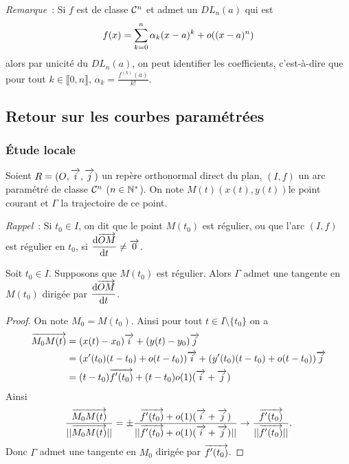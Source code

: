 \emph{Remarque}~: Si \(f\) est de classe \(\mathcal{C}^{n}\) et admet un \(DL_n(a)\)
qui est
\begin{equation}
  f(x) = \sum_{k = 0}^n \alpha_k(x-a)^k +o\mathopen{}\left((x-a)^n\right)
\end{equation}
alors par unicité du \(DL_n(a)\), on peut identifier les coefficients,
c'est-à-dire que pour tout \(k \in \llbracket 0,n \rrbracket\), \(\alpha_k =
\frac{f^{(k)}(a)}{k!}\).

\subsection{Retour sur les courbes paramétrées}

\subsubsection{Étude locale}

Soient \(R = (O,\overrightarrow{i},\overrightarrow{j})\) un repère orthonormal direct du plan, \((I,f)\) un arc
paramétré de classe \(\mathcal{C}^{n}\) (\(n \in \mathbb{N}^*\)). On note
\(M(t)(x(t),y(t))\)le point courant et \(\Gamma\) la trajectoire de ce point.

\emph{Rappel}~: Si \(t_0 \in I\), on dit que le point \(M(t_0)\) est régulier,
ou que l'arc \((I,f)\) est régulier en \(t_0\), si \(\dfrac{\mathrm{d} \overrightarrow{OM}}{\mathrm{d} t} \neq
\overrightarrow{0}\).

\begin{prop}
  Soit \(t_0 \in I\). Supposons que \(M(t_0)\) est régulier. Alors \(\Gamma\)
  admet une tangente en \(M(t_0)\) dirigée par \(\dfrac{\mathrm{d} \overrightarrow{OM}}{\mathrm{d} t}\).
\end{prop}
\begin{proof}
  On note \(M_0 = M(t_0)\). Ainsi pour tout \(t \in I\setminus\{t_0\}\) on a
  \begin{align*}
    \overrightarrow{M_0M(t)} &= (x(t)-x_0)\overrightarrow{i} + (y(t)-y_0)\overrightarrow{j} \\
    &= (x'(t_0)(t-t_0) +o(t-t_0))\overrightarrow{i} + (y'(t_0)(t-t_0) +o(t-t_0))\overrightarrow{j}\\
    & = (t-t_0)\overrightarrow{f'(t_0)} +(t-t_0)o(1)(\overrightarrow{i}+\overrightarrow{j})
  \end{align*}
  Ainsi
  \begin{equation}
    \frac{\overrightarrow{M_0M(t)}}{||\overrightarrow{M_0M(t)}||} = \pm \frac{\overrightarrow{f'(t_0)}
    +o(1)(\overrightarrow{i}+\overrightarrow{j})}{||\overrightarrow{f'(t_0)} +o(1)(\overrightarrow{i}+\overrightarrow{j})||} \to
    \frac{\overrightarrow{f'(t_0)}}{||\overrightarrow{f'(t_0)}||}.
  \end{equation}
  Donc \(\Gamma\) admet une tangente en \(M_0\) dirigée par \(\overrightarrow{f'(t_0)}\).
\end{proof}

